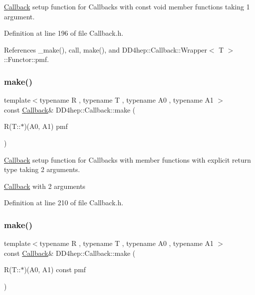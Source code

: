 \hyperlink{class_d_d4hep_1_1_callback}{Callback} setup function for Callbacks with const void member functions taking 1 argument. 



Definition at line 196 of file Callback.\+h.



References \+\_\+make(), call, make(), and D\+D4hep\+::\+Callback\+::\+Wrapper$<$ T $>$\+::\+Functor\+::pmf.

\hypertarget{class_d_d4hep_1_1_callback_abf4ba6d9c58d25400e610a7673454902}{}\label{class_d_d4hep_1_1_callback_abf4ba6d9c58d25400e610a7673454902} 
\subsubsection{\texorpdfstring{make()}{make()}\hspace{0.1cm}{\footnotesize\ttfamily [9/17]}}
{\footnotesize\ttfamily template$<$typename R , typename T , typename A0 , typename A1 $>$ \\
const \hyperlink{class_d_d4hep_1_1_callback}{Callback}\& D\+D4hep\+::\+Callback\+::make (\begin{DoxyParamCaption}\item[{R(T\+::$\ast$)(A0, A1)}]{pmf }\end{DoxyParamCaption})\hspace{0.3cm}{\ttfamily [inline]}}



\hyperlink{class_d_d4hep_1_1_callback}{Callback} setup function for Callbacks with member functions with explicit return type taking 2 arguments. 

\hyperlink{class_d_d4hep_1_1_callback}{Callback} with 2 arguments 

Definition at line 210 of file Callback.\+h.

\hypertarget{class_d_d4hep_1_1_callback_a1fed0a6d4b9a456a76999c4e37648dc9}{}\label{class_d_d4hep_1_1_callback_a1fed0a6d4b9a456a76999c4e37648dc9} 
\subsubsection{\texorpdfstring{make()}{make()}\hspace{0.1cm}{\footnotesize\ttfamily [10/17]}}
{\footnotesize\ttfamily template$<$typename R , typename T , typename A0 , typename A1 $>$ \\
const \hyperlink{class_d_d4hep_1_1_callback}{Callback}\& D\+D4hep\+::\+Callback\+::make (\begin{DoxyParamCaption}\item[{R(T\+::$\ast$)(A0, A1) const}]{pmf }\end{DoxyParamCaption})\hspace{0.3cm}{\ttfamily [inline]}}



